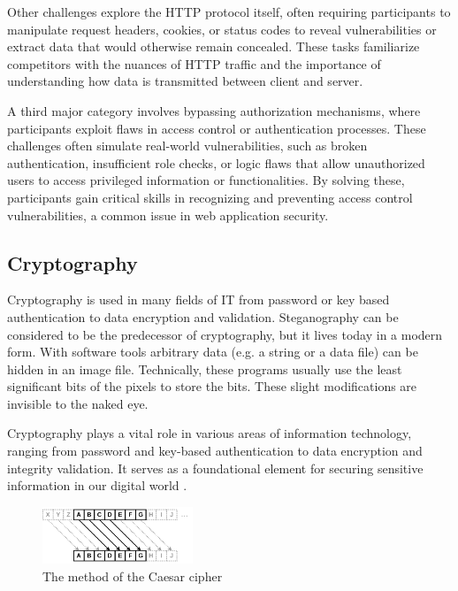 \documentclass[conference]{IEEEtran}
\begin{document}
Other challenges explore the HTTP protocol itself, often requiring participants
to manipulate request headers, cookies, or status codes to reveal
vulnerabilities or extract data that would otherwise remain concealed. These
tasks familiarize competitors with the nuances of HTTP traffic and the
importance of understanding how data is transmitted between client and server.

A third major category involves bypassing authorization mechanisms, where
participants exploit flaws in access control or authentication processes. These
challenges often simulate real-world vulnerabilities, such as broken
authentication, insufficient role checks, or logic flaws that allow
unauthorized users to access privileged information or functionalities. By
solving these, participants gain critical skills in recognizing and preventing
access control vulnerabilities, a common issue in web application security.

\subsection{Cryptography}

Cryptography is used in many fields of IT from password or key based authentication
to data encryption and validation. Steganography can be considered to be the
predecessor of cryptography, but it lives today in a modern form. With software
tools arbitrary data (e.g. a string or a data file) can be hidden in an image file.
Technically, these programs usually use the least significant bits of the pixels
to store the bits. These slight modifications are invisible to the naked eye.

Cryptography plays a vital role in various areas of information technology,
ranging from password and key-based authentication to data encryption and
integrity validation. It serves as a foundational element for securing
sensitive information in our digital world
\cite{luciano1987}.

\begin{figure}[htbp]
	\centering
	\includegraphics[width=0.4\textwidth]{fig/caesar.png}
	\caption{The method of the Caesar cipher}
	\label{fig-caesar}
\end{figure}
\end{document}

